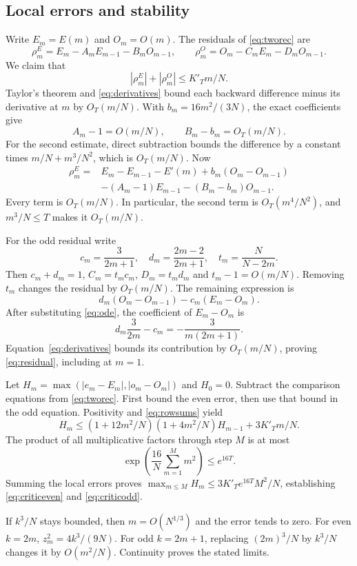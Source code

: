 \documentclass[11pt]{article}
\theoremstyle{definition}
\theoremstyle{remark}
\newcommand{\1}{\mathbf 1}
\begin{document}
\subsection{Local errors and stability}

Write $E_m=E(m)$ and $O_m=O(m)$. The residuals of \eqref{eq:tworec} are
\[
\rho_m^E=E_m-A_mE_{m-1}-B_mO_{m-1},\qquad
\rho_m^O=O_m-C_mE_m-D_mO_{m-1}.
\]
We claim that
\begin{equation}\label{eq:residual}
|\rho_m^E|+|\rho_m^O|\le K'_Tm/N.
\end{equation}
Taylor's theorem and \eqref{eq:derivatives} bound each backward difference minus its derivative at $m$ by $O_T(m/N)$. With $b_m=16m^2/(3N)$, the exact coefficients give
\[
A_m-1=O(m/N),\qquad B_m-b_m=O_T(m/N).
\]
For the second estimate, direct subtraction bounds the difference by a constant times $m/N+m^3/N^2$, which is $O_T(m/N)$. Now
\begin{align*}
\rho_m^E={}&E_m-E_{m-1}-E'(m)+b_m(O_m-O_{m-1})\\
&-(A_m-1)E_{m-1}-(B_m-b_m)O_{m-1}.
\end{align*}
Every term is $O_T(m/N)$. In particular, the second term is $O_T(m^4/N^2)$, and $m^3/N\le T$ makes it $O_T(m/N)$.

For the odd residual write
\[
c_m=\frac3{2m+1},\quad d_m=\frac{2m-2}{2m+1},\quad t_m=\frac N{N-2m}.
\]
Then $c_m+d_m=1$, $C_m=t_mc_m$, $D_m=t_md_m$ and $t_m-1=O(m/N)$. Removing $t_m$ changes the residual by $O_T(m/N)$. The remaining expression is
\[
d_m(O_m-O_{m-1})-c_m(E_m-O_m).
\]
After substituting \eqref{eq:ode}, the coefficient of $E_m-O_m$ is
\[
d_m\frac3{2m}-c_m=-\frac3{m(2m+1)}.
\]
Equation~\eqref{eq:derivatives} bounds its contribution by $O_T(m/N)$, proving \eqref{eq:residual}, including at $m=1$.

Let $H_m=\max(|e_m-E_m|,|o_m-O_m|)$ and $H_0=0$. Subtract the comparison equations from \eqref{eq:tworec}. First bound the even error, then use that bound in the odd equation. Positivity and \eqref{eq:rowsums} yield
\[
H_m\le(1+12m^2/N)(1+4m^2/N)H_{m-1}+3K'_Tm/N.
\]
The product of all multiplicative factors through step $M$ is at most
\[
\exp\left(\frac{16}N\sum_{m=1}^M m^2\right)\le e^{16T}.
\]
Summing the local errors proves $\max_{m\le M}H_m\le3K'_Te^{16T}M^2/N$, establishing \eqref{eq:criticeven} and \eqref{eq:criticodd}.

If $k^3/N$ stays bounded, then $m=O(N^{1/3})$ and the error tends to zero. For even $k=2m$, $z_m^2=4k^3/(9N)$. For odd $k=2m+1$, replacing $(2m)^3/N$ by $k^3/N$ changes it by $O(m^2/N)$. Continuity proves the stated limits.
\end{document}
